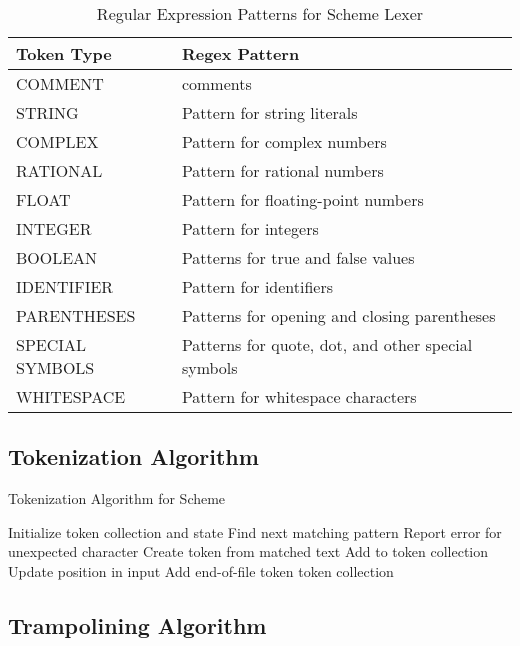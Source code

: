 \documentclass[final]{cmpreport_02}
\begin{document}
\begin{table}[h]
\caption{Regular Expression Patterns for Scheme Lexer}
\label{tab:regexpatterns}
\begin{tabular}{|l|p{10cm}|}
\hline
\textbf{Token Type} & \textbf{Regex Pattern} \\
\hline
COMMENT & comments \\
\hline
STRING & Pattern for string literals \\
\hline
COMPLEX & Pattern for complex numbers \\
\hline
RATIONAL & Pattern for rational numbers \\
\hline
FLOAT & Pattern for floating-point numbers \\
\hline
INTEGER & Pattern for integers \\
\hline
BOOLEAN & Patterns for true and false values \\
\hline
IDENTIFIER & Pattern for identifiers \\
\hline
PARENTHESES & Patterns for opening and closing parentheses \\
\hline
SPECIAL SYMBOLS & Patterns for quote, dot, and other special symbols \\
\hline
WHITESPACE & Pattern for whitespace characters \\
\hline
\end{tabular}
\end{table}

\subsection{Tokenization Algorithm} \label{app:tokenize}
\begin{algorithm}
\caption{Tokenization Algorithm for Scheme}
\label{alg:tokenize}
\begin{algorithmic}[1]
    \State Initialize token collection and state
        \State Find next matching pattern
            \State Report error for unexpected character
        \Else
            \State Create token from matched text
                \State Add to token collection
            \EndIf
            \State Update position in input
        \EndIf
    \EndWhile
    \State Add end-of-file token
    \State \Return token collection
\EndProcedure
\end{algorithmic}
\end{algorithm}
\subsection{Trampolining Algorithm} \label{app:trampoline}
\end{document}
